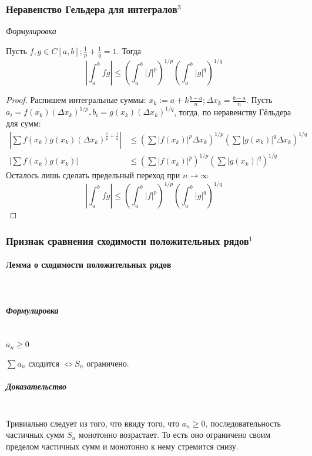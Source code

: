 \documentclass{article}
\let\vanillaparagraph\paragraph
\let\vanillasubparagraph\subparagraph
\renewcommand{\paragraph}[1]{\vanillaparagraph{#1}\mbox{}\\}
\renewcommand{\subparagraph}[1]{\vanillasubparagraph{#1}\mbox{}\\}
\begin{document}
\subsubsection{Неравенство Гельдера для интегралов\texorpdfstring{$^3$}{}}
\textit{Формулировка}

Пусть $f, g \in C[a, b]; \frac{1} {p} + \frac{1} {q} = 1$. Тогда
\begin{equation*}
\left|\int_a^b fg\right| \leq \left(\int_a^b |f|^p\right)^{1/p} \left(\int_a^b |g|^q\right)^{1/q}
\end{equation*}
\begin{proof}
Распишем интегральные суммы: $x_k := a + k\frac{b - a} {n}; \Delta x_k = \frac{b - a} {n}$. Пусть $a_i = f(x_k) (\Delta x_k)^{1/p}, b_i = g(x_k) (\Delta x_k)^{1/q}$, тогда, по неравенству Гёльдера для сумм:
\begin{align*}
\left|\sum f(x_k) g(x_k) (\Delta x_k)^{\frac{1} {p} + \frac{1} {q}} \right| &\leq \left(\sum|f(x_k)|^p \Delta x_k\right)^{1/p} \left(\sum|g(x_k)|^q \Delta x_k\right)^{1/q}\\
\left|\sum f(x_k) g(x_k)  \right| &\leq \left(\sum|f(x_k)|^p \right)^{1/p} \left(\sum|g(x_k)|^q \right)^{1/q}
\end{align*} 
Осталось лишь сделать предельный переход при $n \to \infty$
\begin{equation*}
\left|\int_a^b fg\right| \leq \left(\int_a^b |f|^p\right)^{1/p} \left(\int_a^b |g|^q\right)^{1/q}
\end{equation*}
\end{proof}

\subsubsection{Признак сравнения сходимости положительных рядов\texorpdfstring{$^1$}{}}
\paragraph{Лемма о сходимости положительных рядов}
\subparagraph{Формулировка}
$a_n \ge 0$

$\sum a_n$ сходится $\Leftrightarrow S_n$ ограничено.
\subparagraph{Доказательство}
Тривиально следует из того, что ввиду того, что $a_n \ge 0$, последовательность частичных сумм $S_n$ монотонно возрастает. То есть оно ограничено своим пределом частичных сумм и монотонно к нему стремится снизу.
\end{document}
